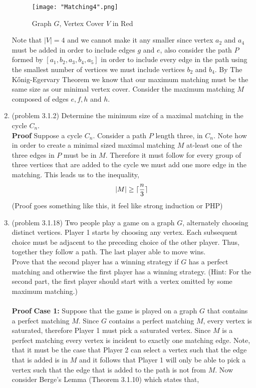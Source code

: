 \documentclass{amsart}
\DeclarePairedDelimiter\ceil{\lceil}{\rceil}
\begin{document}
\begin{enumerate}
\begin{figure}[H]
\caption{Graph $G$, Vertex Cover $V$ in Red}
\centering
\texttt{[image: "Matching4".png]}
\end{figure}
Note that $|V| = 4$ and we cannot make it any smaller since vertex $a_2$ and $a_4$ must be added in order to include edges $g$ and $e$, also consider the path $P$ formed by $[a_1,b_2,a_3,b_4,a_5]$ in order to include every edge in the path using the smallest number of vertices we must include vertices $b_2$ and $b_4$. By The Kőnig-Egervary Theorem we know that our maximum matching must be the same size as our minimal vertex cover. Consider the maximum matching $M$ composed of edges $e, f, h$ and $h$.
\vspace{1in}

\item (problem 3.1.2) Determine the minimum size of a maximal matching in the cycle $C_n.$\\

\textbf{Proof} Suppose a cycle $C_n$.  Consider a path $P$ length three, in $C_n$. Note how in order to create a minimal sized maximal matching $M$ at-least one of the three edges in $P$ must be in $M$. Therefore it must follow for every group of three vertices that are added to the cycle we must add one more edge in the matching. This leads us to the inequality,
\begin{equation*}
|M| \geq \ceil{\frac{n}{3}}
\end{equation*}
(Proof goes something like this, it feel like strong induction or PHP)
\vspace{1.5in}


\item (problem 3.1.18) Two people play a game on a graph $G$, alternately choosing distinct vertices. Player 1 starts by choosing any vertex. Each subsequent choice must be adjacent to the preceding choice of the other player. Thus, together they follow a path. The last player able to move wins.\\
Prove that the second player has a winning strategy if $G$ has a perfect matching and otherwise the first player has a winning strategy. (Hint: For the second part, the first player should start with a vertex omitted by some maximum matching.)\\\\

 
\textbf{Proof} \textbf{Case 1:} Suppose that the game is played on a graph $G$ that contains a perfect matching $M$. Since $G$
 contains a perfect matching $M$, every vertex is saturated, therefore Player 1 must pick a saturated vertex. Since $M$ is a perfect matching every vertex is incident to exactly one matching edge. Note, that it must be the case that Player 2 can select a vertex such that the edge that is added is in $M$ and it follows that Player 1 will only be able to pick a vertex such that the edge that is added to the path is not from $M$. Now consider Berge's Lemma (Theorem 3.1.10) which states that,\\
 

\end{enumerate}
\end{document}
